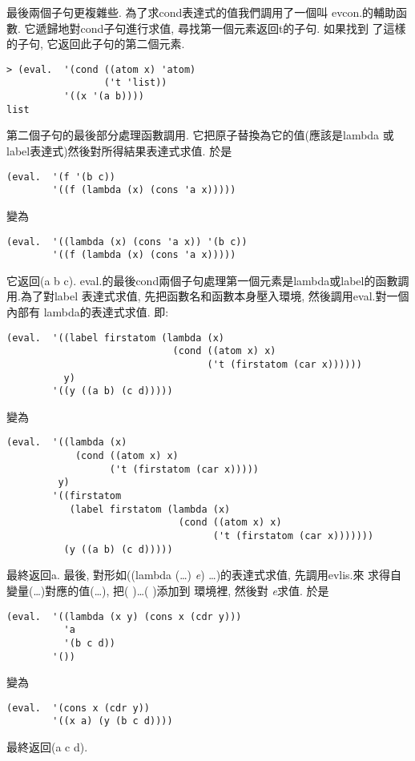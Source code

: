 \documentclass[12pt]{article}
\begin{document}
\begin{CJK}{UTF8}{bsmi}
最後兩個子句更複雜些. 
為了求cond表達式的值我們調用了一個叫 
evcon.的輔助函數. 
它遞歸地對cond子句進行求值, 尋找第一個元素返回t的子句. 
如果找到 
了這樣的子句, 
它返回此子句的第二個元素. 
\begin{verbatim} 
> (eval.  '(cond ((atom x) 'atom) 
                 ('t 'list)) 
          '((x '(a b)))) 
list 
\end{verbatim} 
第二個子句的最後部分處理函數調用. 
它把原子替換為它的值(應該是lambda 
或label表達式)然後對所得結果表達式求值. 
於是 
\begin{verbatim} 
(eval.  '(f '(b c)) 
        '((f (lambda (x) (cons 'a x))))) 
\end{verbatim} 
變為 
\begin{verbatim} 
(eval.  '((lambda (x) (cons 'a x)) '(b c)) 
        '((f (lambda (x) (cons 'a x))))) 
\end{verbatim} 
它返回(a b c). 
eval.的最後cond兩個子句處理第一個元素是lambda或label的函數調用.為了對label 
表達式求值, 
先把函數名和函數本身壓入環境, 
然後調用eval.對一個內部有 
lambda的表達式求值. 
即: 
\begin{verbatim} 
(eval.  '((label firstatom (lambda (x) 
                             (cond ((atom x) x) 
                                   ('t (firstatom (car x)))))) 
          y) 
        '((y ((a b) (c d))))) 
\end{verbatim} 
變為 
\begin{verbatim} 
(eval.  '((lambda (x) 
            (cond ((atom x) x) 
                  ('t (firstatom (car x))))) 
         y) 
        '((firstatom 
           (label firstatom (lambda (x) 
                              (cond ((atom x) x) 
                                    ('t (firstatom (car x))))))) 
          (y ((a b) (c d))))) 
\end{verbatim} 
最終返回a. 
最後, 對形如((lambda 
(\pone\dots\pn) 
{\it 
e}) 
\aone\dots\an)的表達式求值, 先調用evlis.來 
求得自變量(\aone\dots\an)對應的值(\vone\dots\vn), 把(\pone 
\vone)\dots(\pn 
\vn)添加到 
環境裡, 
然後對{\it 
e}求值. 
於是 
\begin{verbatim} 
(eval.  '((lambda (x y) (cons x (cdr y))) 
          'a 
          '(b c d)) 
        '()) 
\end{verbatim} 
變為 
\begin{verbatim} 
(eval.  '(cons x (cdr y)) 
        '((x a) (y (b c d)))) 
\end{verbatim} 
最終返回(a 
c 
d). 

\end{CJK}
\end{document}
